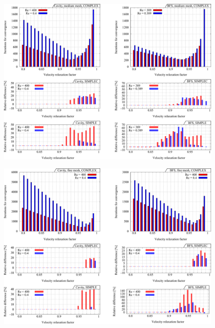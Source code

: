 \documentclass[final,3p,times,10pt,onecolumn]{myElsarticle}
\numberwithin{equation}{section}
\begin{document}
\begin{figure}[t!]
\centering
\includegraphics[width=17cm]{fig/Results/complexMedium.pdf}
\caption{}
\label{Fig:complexMedium}
\end{figure}

\begin{figure}[t!]
\centering
\includegraphics[width=17cm]{fig/Results/complexFine.pdf}
\caption{}
\label{Fig:complexFine}
\end{figure}





\end{document}
